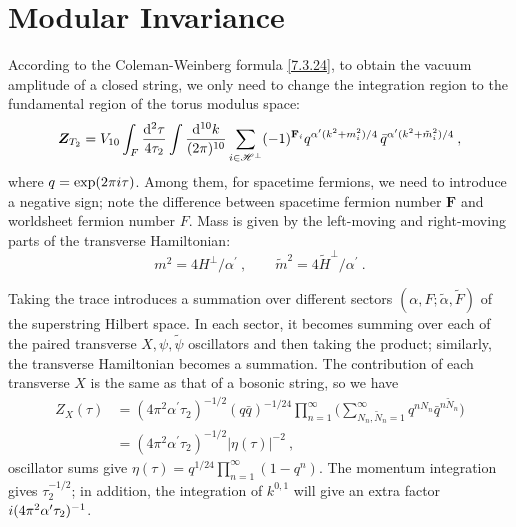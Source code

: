 	\section{Modular Invariance}
	
	
	According to the Coleman-Weinberg formula \eqref{7.3.24}, to obtain the vacuum amplitude of a closed string, we only need to change the integration region to the fundamental region of the torus modulus space:
	\begin{equation}
		\bm{Z}_{T_{2}} = V_{10}\int_{F}\frac{\mathrm{d}^{2}\tau}{4\tau_{2}}\int\frac{\mathrm{d}^{10}k}{(2\pi)^{10}}\sum_{i\in\mathscr{H}^{\bot}}(-1)^{\mathbf{F}_{i}}q^{\alpha^{\prime}(k^{2}+m_{i}^{2})/4}\,\bar{q}^{\alpha^{\prime}(k^{2}+\tilde{m}_{i}^{2})/4}\:,\label{10.7.1}
	\end{equation}
	where $q=\exp(2\pi i\tau)$. Among them, for spacetime fermions, we need to introduce a negative sign; note the difference between spacetime fermion number $\mathbf{F}$ and worldsheet fermion number $F$. Mass is given by the left-moving and right-moving parts of the transverse Hamiltonian:
	\begin{equation}
		m^{2} = 4H^{\bot}/\alpha^{\prime}\:,\qquad \tilde{m}^{2}=4\tilde{H}^{\bot}/\alpha^{\prime} \: .\label{10.7.2}
	\end{equation}
	
	
	Taking the trace introduces a summation over different sectors $(\alpha,F;\tilde{\alpha},\tilde{F})$ of the superstring Hilbert space. In each sector, it becomes summing over each of the paired transverse $X,\psi,\tilde{\psi}$ oscillators and then taking the product; similarly, the transverse Hamiltonian becomes a summation. The contribution of each transverse $X$ is the same as that of a bosonic string, so we have
	\begin{align}
		Z_{X}(\tau)&=(4\pi^{2}\alpha^{\prime}\tau_{2})^{-1/2} (q\bar{q})^{-1/24}
		\prod_{n=1}^{\infty}\biggl(
		\sum_{N_{n},\tilde{N}_{n}=1}^{\infty}q^{n N_{n}}\bar{q}^{n\tilde{N}_{n}}\biggr) \nonumber \\
		&=(4\pi^{2}\alpha^{\prime}\tau_{2})^{-1/2} \lvert\eta(\tau)\rvert^{-2} \:,
		\label{10.7.3}
	\end{align}
	oscillator sums give $\eta(\tau)=q^{1/24}\prod_{n=1}^{\infty}(1-q^{n})$. The momentum integration gives $\tau_{2}^{-1/2}$; in addition, the integration of $k^{0,1}$ will give an extra factor $i(4\pi^{2}\alpha^{\prime}\tau_{2})^{-1}$.
	
